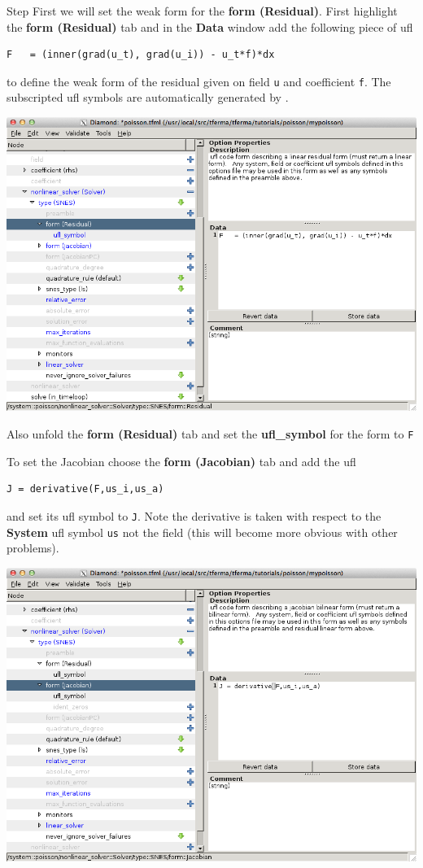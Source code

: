 \begin{steps}{Step}
First we will set the weak form for the \textbf{form (Residual)}.
First highlight the  \textbf{form (Residual)} tab and in the
\textbf{Data} window add the following piece of ufl
\begin{lstlisting}[style=ufl]
F   = (inner(grad(u_t), grad(u_i)) - u_t*f)*dx
\end{lstlisting}
to define the weak form of the residual given on field \texttt{u} and
coefficient \texttt{f}.  The subscripted ufl symbols are automatically
generated by \TF{}. 
\begin{center}
    \includegraphics[width=\diamondwidth]{figures/screendumps/diamond_poisson_11c.png}
\end{center}
Also unfold the \textbf{form (Residual)} tab and set the
\textbf{ufl\_symbol} for the form to \texttt{F}

To set the Jacobian choose  the \textbf{form (Jacobian)} tab and add
the ufl
\begin{lstlisting}[style=ufl]
J = derivative(F,us_i,us_a)
\end{lstlisting}
and set its ufl symbol to \texttt{J}.  Note the derivative is taken
with respect to the \textbf{System} ufl symbol \texttt{us} not the
field (this will become more obvious with other problems).
\begin{center}
    \includegraphics[width=\diamondwidth]{figures/screendumps/diamond_poisson_11d.png}
\end{center}


\end{steps}
